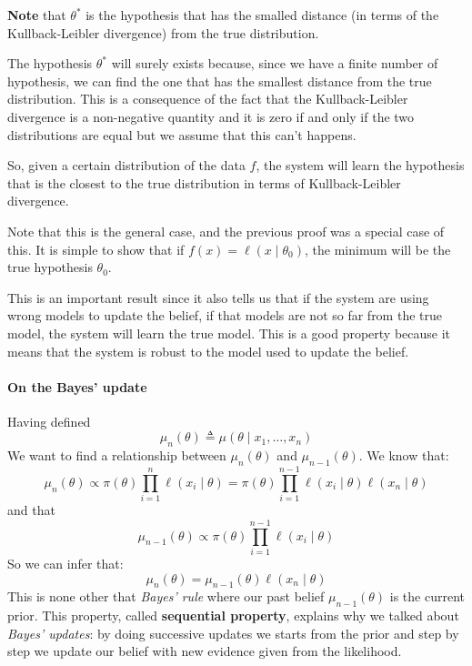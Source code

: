 \textbf{Note} that $\theta^{\ast} $ is the hypothesis that has the smalled distance (in terms of the Kullback-Leibler divergence) from the true distribution.

The hypothesis $\theta^\ast$ will surely exists because, since we have a finite number of hypothesis, we can find the one that has the smallest distance from the true distribution. This is a consequence of the fact that the Kullback-Leibler divergence is a non-negative quantity and it is zero if and only if the two distributions are equal but we assume that this can't happens.

So, given a certain distribution of the data $f$, the system will learn the hypothesis that is the closest to the true distribution in terms of Kullback-Leibler divergence.

Note that this is the general case, and the previous proof was a special case of this. It is simple to show that if $f(x) = \ell(x \mid \theta_0)$, the minimum will be the true hypothesis $\theta_0$.

This is an important result since it also tells us that if the system are using wrong models to update the belief, if that models are not so far from the true model, the system will learn the true model. This is a good property because it means that the system is robust to the model used to update the belief.

\paragraph*{On the Bayes' update}
Having defined
\[
    \mu_n(\theta) \triangleq \mu(\theta \mid x_1, \dots, x_n)
\]
We want to find a relationship between $\mu_n(\theta)$ and $\mu_{n-1}(\theta)$.
We know that:
\[
    \mu_n(\theta) \propto \pi(\theta) \prod_{i=1}^n \ell(x_i \mid \theta) = \pi(\theta) \prod_{i=1}^{n-1} \ell(x_i \mid \theta) \ell(x_n \mid \theta)
\]
and that
\[
    \mu_{n-1}(\theta) \propto \pi(\theta) \prod_{i=1}^{n-1} \ell(x_i \mid \theta)
\]
So we can infer that:
\[
    \mu_n(\theta) = \mu_{n-1}(\theta) \ell(x_n \mid \theta)
\]
This is none other that \textit{Bayes' rule} where our past belief $\mu_{n-1}(\theta)$ is the current prior. This property, called \textbf{sequential property}, explains why we talked about \textit{Bayes' updates}: by doing successive updates we starts from the prior and step by step we update our belief with new evidence given from the likelihood.

